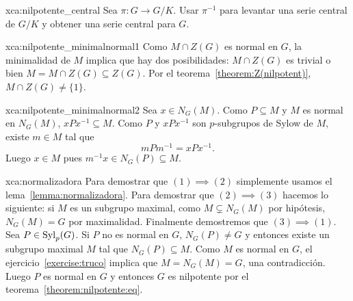 \begin{sol}{xca:nilpotente_central}
	Sea $\pi\colon G\to G/K$. Usar $\pi^{-1}$ para levantar una serie central de $G/K$ y obtener una serie central para $G$.
\end{sol}

\begin{sol}{xca:nilpotente_minimalnormal1}
 	Como $M\cap Z(G)$ es normal en $G$, la minimalidad de $M$ implica que hay
 	dos posibilidades: $M\cap Z(G)$ es trivial o bien $M=M\cap Z(G)\subseteq Z(G)$.
 	Por el teorema~\ref{theorem:Z(nilpotent)}, $M\cap Z(G)\ne \{1\}$.
\end{sol}

\begin{sol}{xca:nilpotente_minimalnormal2}
	Sea $x\in N_G(M)$. Como $P\subseteq M$ y $M$ es normal en $N_G(M)$,
	$xPx^{-1}\subseteq M$.  Como $P$ y $xPx^{-1}$ son $p$-subgrupos de Sylow de
	$M$, existe $m\in M$ tal que 
	\[
	mPm^{-1}=xPx^{-1}.
	\]
	Luego $x\in M$ pues
	$m^{-1}x\in N_G(P)\subseteq M$. 
\end{sol}


\begin{sol}{xca:normalizadora}
	Para demostrar que $(1)\implies(2)$ simplemente usamos el
	lema~\ref{lemma:normalizadora}. Para demostrar que $(2)\implies(3)$ hacemos
	lo siguiente: si $M$ es un subgrupo maximal, como $M\subsetneq N_G(M)$ por
	hipótesis, $N_G(M)=G$ por maximalidad. Finalmente demostremos que
	$(3)\implies(1)$.  Sea $P\in\mathrm{Syl}_p(G)$. Si $P$ no es normal en $G$,
	$N_G(P)\ne G$ y entonces existe un subgrupo maximal $M$ tal que
	$N_G(P)\subseteq M$. Como $M$ es normal en $G$, el
	ejercicio~\ref{exercise:truco} implica que $M=N_G(M)=G$, una contradicción.
	Luego $P$ es normal en $G$ y entonces $G$ es nilpotente por el
	teorema~\ref{theorem:nilpotente:eq}.
\end{sol}



